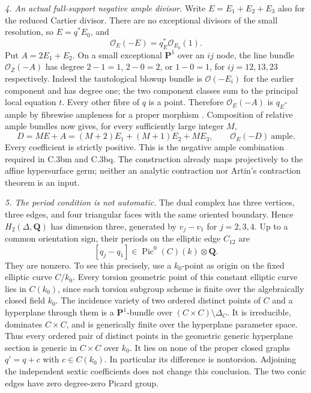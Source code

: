 \emph{4. An actual full-support negative ample divisor.}
Write $E=E_1+E_2+E_3$ also for the reduced Cartier divisor.
There are no exceptional divisors of the small resolution, so
$E=q^*E_0$, and
\[
                     \mathcal O_E(-E)=q_E^*\mathcal O_{E_0}(1).
\]
Put $A=2E_1+E_2$. On a small exceptional $\mathbf P^1$ over an
$ij$ node, the line bundle $\mathcal O_Z(-A)$ has degree
$2-1=1$, $2-0=2$, or $1-0=1$, for $ij=12,13,23$ respectively.
Indeed the tautological blowup bundle is $\mathcal O(-E_i)$ for
the earlier component and has degree one; the two component
classes sum to the principal local equation $t$.
Every other fibre of $q$ is a point. Therefore
$\mathcal O_E(-A)$ is $q_E$-ample by fibrewise ampleness for a
proper morphism
\citep[Lemma 37.50.3 and complete proof]{frSNCPeriodFibreAmple}.
Composition of relative ample bundles
\citep[Lemma 29.38.8 and proof]{frC3beStacksCompositeAmple}
now gives, for every sufficiently large integer $M$,
\begin{equation}
 D=M E+A=(M+2)E_1+(M+1)E_2+M E_3,
                   \qquad\mathcal O_E(-D)\ \text{ample}.
                                                        \tag{NP.8}
\end{equation}
Every coefficient is strictly positive. This is the negative
ample combination required in C.3bm and C.3bq. The construction
already maps projectively to the affine hypersurface germ;
neither an analytic contraction nor Artin's contraction theorem
is an input.

\emph{5. The period condition is not automatic.}
The dual complex has three vertices, three edges, and four
triangular faces with the same oriented boundary. Hence
$H_2(\Delta,\mathbf Q)$ has dimension three, generated by
$v_j-v_1$ for $j=2,3,4$. Up to a common orientation sign, their
periods on the elliptic edge $C_{12}$ are
\[
                  [q_j-q_1]\in\operatorname{Pic}^0(C)(k)\otimes\mathbf Q.
\]
They are nonzero. To see this precisely, use a $k_0$-point as
origin on the fixed elliptic curve $C/k_0$.
Every torsion geometric point of this constant elliptic curve
lies in $C(k_0)$, since each torsion subgroup scheme is finite
over the algebraically closed field $k_0$.
The incidence variety of two ordered distinct points of $C$
and a hyperplane through them is a $\mathbf P^1$-bundle over
$(C\times C)\setminus\Delta_C$. It is irreducible, dominates
$C\times C$, and is generically finite over the hyperplane
parameter space. Thus every ordered pair of distinct points in
the geometric generic hyperplane section is generic in
$C\times C$ over $k_0$. It lies on none of the proper closed
graphs $q'=q+c$ with $c\in C(k_0)$. In particular its difference
is nontorsion. Adjoining the independent sextic coefficients
does not change this conclusion. The two conic edges have
zero degree-zero Picard group.

